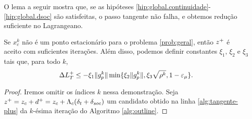 O lema a seguir mostra que, se as hipóteses
\ref{hip:global.continuidade}-\ref{hip:global.dsoc} são satisfeitas, o passo
tangente não falha, e obtemos redução suficiente no Lagrangeano.
\begin{lemma} Se $x_c^k$ não é um ponto estacionário para o
  problema \eqref{prob:geral}, então $z^{+}$ \'e aceito com suficientes iterações.
  Al\'em disso,
  podemos definir constantes $\xi_1$, $\xi_2$ e $\xi_3$ tais que, para todo $k$,
\begin{equation}\visiblelbl{limDLHp} \DHp \leq
-\xi_1\norma{\gpk{k}}\min\{\xi_2\norma{\gpk{k}},\xi_3\sqrt{\rho^k},1-\epsmu\}.
\end{equation} \end{lemma} \begin{proof} Iremos omitir os \'indices $k$ nessa
  demonstra\c{c}\~ao. Seja $z^{+} = z_c + d^{+} = z_c + \Lambda_c(\delta_t + \delta_{soc})$
  um candidato obtido na linha \ref{alg:tangente-plus} da $k$-\'esima
  itera\c{c}\~ao do Algoritmo \ref{alg:outline}.


\end{proof}
